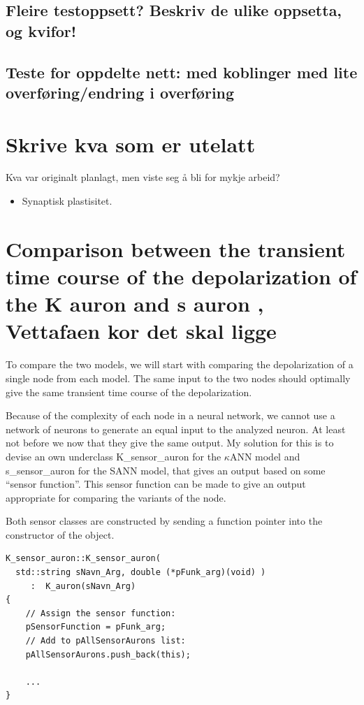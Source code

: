 	\subsection{Fleire testoppsett? Beskriv de ulike oppsetta, og kvifor!}
	\subsection{Teste for oppdelte nett: med koblinger med lite overføring/endring i overføring}

\section{Skrive kva som er utelatt} %
Kva var originalt planlagt, men viste seg å bli for mykje arbeid?

\begin{itemize}
 	\item Synaptisk plastisitet.
\end{itemize}




\section{Comparison between the transient time course of the depolarization of the K auron and s auron ,   Vettafaen kor det skal ligge}
To compare %
			the two models, we will start with comparing the depolarization of a single node from each model.
The same input to the two nodes should optimally give the same transient time course of the depolarization.

Because of the complexity of each node in a neural network, we cannot use a network of neurons to generate an equal input to the analyzed neuron. 
At least not before we now that they give the same output.
My solution for this is 
						to devise an own underclass K\_sensor\_auron for the $\kappa$ANN model and s\_sensor\_auron for the SANN model, that gives an output based on some ``sensor function''.
This sensor function can be made to give an output appropriate for comparing the variants of the node.

Both sensor classes are constructed by sending a function pointer into the constructor of the object. 

\begin{lstlisting}
K_sensor_auron::K_sensor_auron(
  std::string sNavn_Arg, double (*pFunk_arg)(void) ) 
     :  K_auron(sNavn_Arg)
{
	// Assign the sensor function:
	pSensorFunction = pFunk_arg;
	// Add to pAllSensorAurons list:
	pAllSensorAurons.push_back(this);

	...
}
\end{lstlisting}

